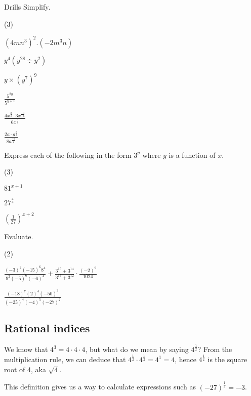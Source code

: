 \documentclass[../../main.tex]{subfiles}
\begin{document}
\begin{questions}{Drills}
Simplify.
\begin{question_set}(3)
    \item $\left(4mn^{3}\right)^{2}.\left(-2m^{3}n\right)$
    \item $y^{4}\left(y^{28} \div y^{2}\right)$
    \item $y \times \left(y^{7}\right)^{9}$
    \item $\frac{5^{2y}}{5^{y+1}}$
    \item $\frac{4x^{\frac{2}{3}} \cdot 3x^\frac{-1}{-6}}{6x^{\frac{3}{4}}}$
    \item $\frac{2a \cdot a^{\frac{3}{4}}}{8a^\frac{-1}{2}}$ %
\end{question_set}

Express each of the following in the form $3^{y}$ where $y$ is a function of $x$.
\begin{question_set}(3)
    \item $81^{x+1}$
    \item $27^{\frac{x}{4}}$
    \item $\left(\frac{1}{27}\right)^{x+2}$
\end{question_set}

Evaluate.
\begin{question_set}(2)
    \item $\frac{(-3)^{2}(-15)^{6}8^{4}}{9^{2}(-5)^{6}(-6)^{4}}+\frac{3^{15}+3^{14}}{3^{14}+3^{12}} \cdot \frac{(-2)^{9}}{1024}$
    \item $\frac{(-18)^{7}(2)^{4}(-50)^{3}}{(-25)^{4}(-4)^{5}(-27)^{2}}$
\end{question_set}
\end{questions}

\subsection{Rational indices}
We know that $4^{3}=4 \cdot 4 \cdot 4$, but what do we mean by saying $4^{\frac{1}{2}}$?
From the multiplication rule, we can deduce that $4^{\frac{1}{2}} \cdot 4^{\frac{1}{2}}=4^{1}=4$, hence $4^{\frac{1}{2}}$ is the square root of 4, aka $\sqrt{4}$.

This definition gives us a way to calculate expressions such as $(-27)^{\frac{1}{3}}=-3$. %
\end{document}
